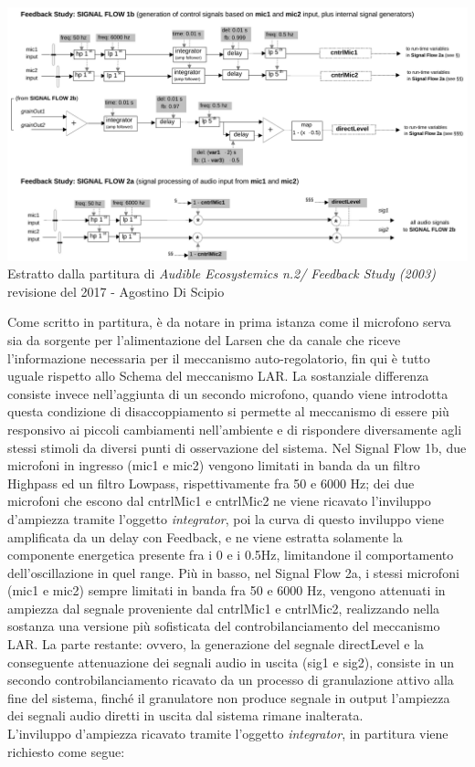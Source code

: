 \begin{center}
\includegraphics[width=14cm]{figures/LARFeedbackstudy2017.pdf} \\
{Estratto dalla partitura di \textit{Audible Ecosystemics n.2/ Feedback Study (2003)} \\
revisione del 2017 - Agostino Di Scipio} \\ 
\vspace{0.5cm}
\end{center}

Come scritto in partitura, è da notare in prima istanza
come il microfono serva sia da sorgente per l'alimentazione del Larsen che
da canale che riceve l'informazione necessaria per il meccanismo auto-regolatorio,
fin qui è tutto uguale rispetto allo Schema del meccanismo LAR.
La sostanziale differenza consiste invece nell'aggiunta di un secondo microfono,
quando viene introdotta questa condizione di disaccoppiamento si 
permette al meccanismo di essere più responsivo ai piccoli cambiamenti nell'ambiente
e di rispondere diversamente agli stessi stimoli da diversi punti di osservazione del sistema.
Nel Signal Flow 1b, due microfoni in ingresso (mic1 e mic2) 
vengono limitati in banda da un filtro Highpass ed 
un filtro Lowpass, rispettivamente fra 50 e 6000 Hz; dei due microfoni che escono 
dal cntrlMic1 e cntrlMic2 ne viene ricavato l'inviluppo d'ampiezza tramite
l'oggetto \textit{integrator}, poi la curva di questo inviluppo viene amplificata da 
un delay con Feedback, e ne viene estratta solamente la componente energetica 
presente fra i 0 e i 0.5Hz, limitandone il comportamento dell'oscillazione in quel range.
Più in basso, nel Signal Flow 2a, i stessi microfoni (mic1 e mic2) sempre
limitati in banda fra 50 e 6000 Hz, vengono attenuati in ampiezza dal segnale
proveniente dal cntrlMic1 e cntrlMic2, realizzando nella sostanza una 
versione più sofisticata del controbilanciamento del meccanismo LAR.
La parte restante: ovvero, la generazione del segnale directLevel e la 
conseguente attenuazione dei segnali audio in uscita (sig1 e sig2),
consiste in un secondo controbilanciamento ricavato da un processo di granulazione
attivo alla fine del sistema, finché il granulatore non produce segnale in output 
l'ampiezza dei segnali audio diretti in uscita dal sistema rimane inalterata. \\
L'inviluppo d'ampiezza ricavato tramite l'oggetto \textit{integrator}, in partitura 
viene richiesto come segue:


